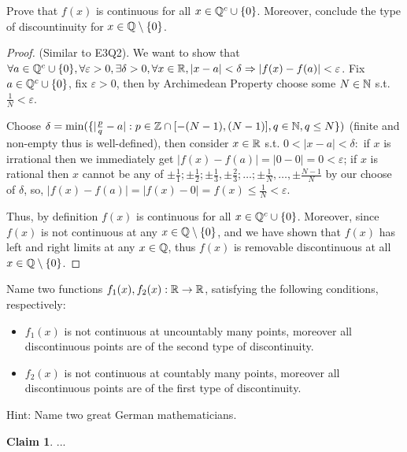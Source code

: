 \documentclass{homework}
\newcommand{\R}{\bb{R}} %
\newcommand{\Q}{\bb{Q}} %
\newcommand{\Z}{\bb{Z}} %
\newcommand{\N}{\bb{N}} %
\newcommand{\Ra}{\Rightarrow}
\newcommand{\?}{\stackrel{?}{=}}
\newcommand{\ep}{\varepsilon}
\theoremstyle{definition}
\newtheorem*{claim}{Claim}
\begin{document}
\question[3] Prove that $f(x)$ is continuous for all $x\in\Q^c\cup\{0\}$. Moreover, conclude the type of discountinuity for $x\in\Q\setminus\{0\}$.

\begin{proof}
    (Similar to E3Q2). We want to show that $\forall a\in\Q^c\cup\{0\},\forall\ep>0,\exists\delta>0,\forall x\in\R, |x-a|<\delta\Ra|f(x)-f(a)|<\ep$. Fix $a\in\Q^c\cup\{0\}$, fix $\ep>0$, then by Archimedean Property choose some $N\in\N$ s.t. $\frac1N<\ep$.

    Choose $\delta=\min(\{|\frac{p}{q}-a|:p\in\Z\cap[-(N-1), (N-1)], q\in\N, q\leq N\})$ (finite and non-empty thus is well-defined), then consider $x\in\R$ s.t. $0<|x-a|<\delta:$ if $x$ is irrational then we immediately get $|f(x)-f(a)|=|0-0|=0<\ep$; if $x$ is rational then $x$ cannot be any of $\pm\frac11; \pm\frac12; \pm\frac13, \pm\frac23; \ldots; \pm\frac1N, \ldots, \pm\frac{N-1}{N}$ by our choose of $\delta$, so, $|f(x)-f(a)|=|f(x)-0|=f(x)\leq\frac1{N}<\ep$.

    Thus, by definition $f(x)$ is continuous for all $x\in\Q^c\cup\{0\}$. Moreover, since $f(x)$ is not continuous at any $x\in\Q\setminus\{0\}$, and we have shown that $f(x)$ has left and right limits at any $x\in\Q$, thus $f(x)$ is removable discontinuous at all $x\in\Q\setminus\{0\}$.
\end{proof}

\question[4] Name two functions $f_1(x), f_2(x):\R\to\R$, satisfying the following conditions, respectively:
\begin{itemize}
    \item $f_1(x)$ is not continuous at uncountably many points, moreover all discontinuous points are of the second type of discontinuity.
    \item $f_2(x)$ is not continuous at countably many points, moreover all discontinuous points are of the first type of discontinuity.
\end{itemize}

Hint: Name two great German mathematicians. 

\begin{claim}
    ...
\end{claim}
\end{document}
